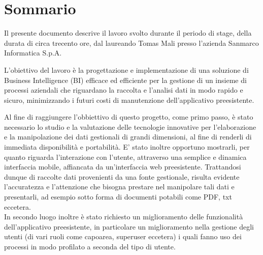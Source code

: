 
\cleardoublepage
{}
{}
\begingroup
\let\clearpage\relax
\let\cleardoublepage\relax
\let\cleardoublepage\relax

\chapter*{Sommario}

Il presente documento descrive il lavoro svolto durante il periodo di stage, della durata di circa trecento ore, dal laureando Tomas Mali presso l'azienda Sanmarco Informatica S.p.A.

L'obiettivo del lavoro è la progettazione e implementazione di una soluzione di \gls{Business Intelligence} (BI) efficace ed efficiente  per la gestione di un insieme di processi aziendali  che riguardano la raccolta e l'analisi dati in modo rapido e sicuro, minimizzando i futuri costi di manutenzione dell'applicativo preesistente.\

Al fine di raggiungere l'obbiettivo di questo progetto, come primo passo, è stato necessario lo studio e la valutazione delle tecnologie innovative  per l'elaborazione e la manipolazione dei dati gestionali di grandi dimensioni, al fine di renderli di immediata disponibilità e portabilità. E' stato inoltre opportuno mostrarli, per quanto riguarda l'interazione con l'utente, attraverso una semplice e dinamica interfaccia mobile, affiancata da un'interfaccia web preesistente. Trattandosi dunque di raccolte dati provenienti da una fonte gestionale, risulta evidente l'accuratezza e l'attenzione  che bisogna prestare nel manipolare tali dati e presentarli, ad esempio sotto forma di documenti potabili come PDF, txt eccetera.\\ 
In secondo luogo inoltre è stato richiesto un miglioramento delle funzionalità dell'applicativo preesistente, in particolare un miglioramento nella gestione degli utenti (di vari ruoli come capoarea, superuser eccetera) i quali fanno uso dei processi  in modo profilato a seconda del tipo di utente.

%
%

\endgroup			

\vfill

